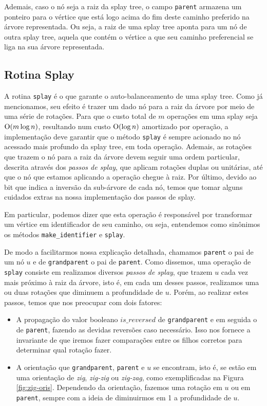 Ademais, caso o nó seja a raiz da splay tree, o campo \texttt{parent} armazena um ponteiro para o vértice que está logo acima do fim deste caminho preferido na árvore representada. Ou seja, a raiz de uma splay tree aponta para um nó de outra splay tree, aquela que contém o vértice a que seu caminho preferencial se liga na sua árvore representada.

\subsection{Rotina Splay}
\label{subsection:lct-splay-splay}

A rotina \texttt{splay} é o que garante o auto-balanceamento de uma splay tree. Como já mencionamos, seu efeito é trazer um dado nó para a raiz da árvore por meio de uma série de rotações. Para que o custo total de $m$ operações em uma splay seja $\mathrm{O} (m \log n) $, resultando num custo $\mathrm{O}(\log n)$ amortizado por operação, a implementação deve garantir que o método \texttt{splay} é sempre acionado no nó acessado mais profundo da splay tree, em toda operação. Ademais, as rotações que trazem o nó para a raiz da árvore devem seguir uma ordem particular, descrita através dos \emph{passos de splay}, que aplicam rotações duplas ou unitárias, até que o nó que estamos aplicando a operação chegue à raiz. Por último, devido ao bit que indica a inversão da sub-árvore de cada nó, temos que tomar alguns cuidados extras na nossa implementação dos passos de splay.

Em particular, podemos dizer que esta operação é responsável por transformar um vértice em identificador de seu caminho, ou seja, entendemos como sinônimos os métodos \texttt{make\_identifier} e \texttt{splay}.

De modo a facilitarmos nossa explicação detalhada, chamamos \texttt{parent} o pai de um nó $u$ e de \texttt{grandparent} o pai de \texttt{parent}. Como dissemos, uma operação de \texttt{splay} consiste em realizamos diversos \emph{passos de splay}, que trazem $u$ cada vez mais próximo à raiz da árvore, isto é, em cada um desses passos, realizamos uma ou duas rotações que diminuem a profundidade de $u$. Porém, ao realizar estes passos, temos que nos preocupar com dois fatores:

\begin{itemize}
    \item A propagação do valor booleano $is\_reversed$ de \texttt{grandparent} e em seguida o de \texttt{parent}, fazendo as devidas reversões caso necessário. Isso nos fornece a invariante de que iremos fazer comparações entre os filhos corretos para determinar qual rotação fazer.
    \item A orientação que \texttt{grandparent}, \texttt{parent} e $u$ se encontram, isto é, se estão em uma orientação de \textit{zig}, \textit{zig-zig} ou \textit{zig-zag}, como exemplificadas na Figura \ref{fig:zig-oris}. Dependendo da orientação, fazemos uma rotação em $u$ ou em \texttt{parent}, sempre com a ideia de diminuirmos em 1 a profundidade de $u$.
\end{itemize}

